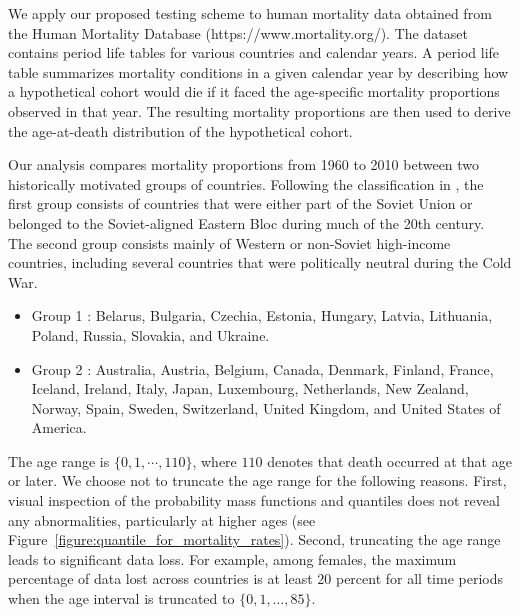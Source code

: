 We apply our proposed testing scheme to human mortality data obtained from the Human Mortality Database (https://www.mortality.org/). The dataset contains period life tables for various countries and calendar years. A period life table summarizes mortality conditions in a given calendar year by describing how a hypothetical cohort would die if it faced the age-specific mortality proportions observed in that year. The resulting mortality proportions are then used to derive the age-at-death distribution of the hypothetical cohort.

Our analysis compares mortality proportions from 1960 to 2010 between two historically motivated groups of countries. Following the classification in \cite{dubey2019frechet}, the first group consists of countries that were either part of the Soviet Union or belonged to the Soviet-aligned Eastern Bloc during much of the 20th century. The second group consists mainly of Western or non-Soviet high-income countries, including several countries that were politically neutral during the Cold War.
\begin{itemize}
    \item Group 1 : Belarus, Bulgaria, Czechia, Estonia, Hungary, Latvia, Lithuania, Poland, Russia, Slovakia, and Ukraine.
    \item Group 2 : Australia, Austria, Belgium, Canada, Denmark, Finland, France, Iceland, Ireland, Italy, Japan, Luxembourg, Netherlands, New Zealand, Norway, Spain, Sweden, Switzerland, United Kingdom, and United States of America.
\end{itemize}
The age range is $\{0,1,\cdots,110\}$, where $110$ denotes that death occurred at that age or later. We choose not to truncate the age range for the following reasons. First, visual inspection of the probability mass functions and quantiles does not reveal any abnormalities, particularly at higher ages (see Figure~\ref{figure:quantile_for_mortality_rates}). Second, truncating the age range leads to significant data loss. For example, among females, the maximum percentage of data lost across countries is at least $20$ percent for all time periods when the age interval is truncated to $\{0,1,\dots,85\}$.

